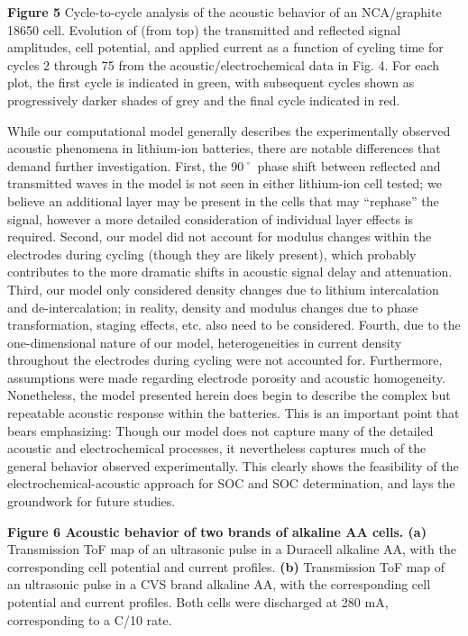 \documentclass[]{article}
\begin{document}
\textbf{Figure 5 \textbar{}} Cycle-to-cycle analysis of the acoustic
behavior of an NCA/graphite 18650 cell. Evolution of (from top) the
transmitted and reflected signal amplitudes, cell potential, and applied
current as a function of cycling time for cycles 2 through 75 from the
acoustic/electrochemical data in Fig. 4. For each plot, the first cycle
is indicated in green, with subsequent cycles shown as progressively
darker shades of grey and the final cycle indicated in red.{~}

{ }While our computational model generally describes the experimentally
observed acoustic phenomena in lithium-ion batteries, there are notable
differences that demand further investigation. First, the 90˚ phase
shift between reflected and transmitted waves in the model is not seen
in either lithium-ion cell tested; we believe an additional layer may be
present in the cells that may ``rephase'' the signal, however a more
detailed consideration of individual layer effects is required. Second,
our model did not account for modulus changes within the electrodes
during cycling (though they are likely present), which probably
contributes to the more dramatic shifts in acoustic signal delay and
attenuation. Third, our model only considered density changes due to
lithium intercalation and de-intercalation; in reality, density and
modulus changes due to phase transformation, staging effects, etc. also
need to be considered. Fourth, due to the one-dimensional nature of our
model, heterogeneities in current density throughout the electrodes
during cycling were not accounted for. Furthermore, assumptions were
made regarding electrode porosity and acoustic homogeneity. Nonetheless,
the model presented herein does begin to describe the complex but
repeatable acoustic response within the batteries. This is an important
point that bears emphasizing: Though our model does not capture many of
the detailed acoustic and electrochemical processes, it nevertheless
captures much of the general behavior observed experimentally. This
clearly shows the feasibility of the electrochemical-acoustic approach
for SOC and SOC determination, and lays the groundwork for future
studies.

\textbf{Figure 6 \textbar{} Acoustic behavior of two brands of alkaline
AA cells. (a)} Transmission ToF map of an ultrasonic pulse in a Duracell
alkaline AA, with the corresponding cell potential and current profiles.
\textbf{(b)} Transmission ToF map of an ultrasonic pulse in a CVS brand
alkaline AA, with the corresponding cell potential and current profiles.
Both cells were discharged at 280 mA, corresponding to a C/10 rate.
\end{document}
